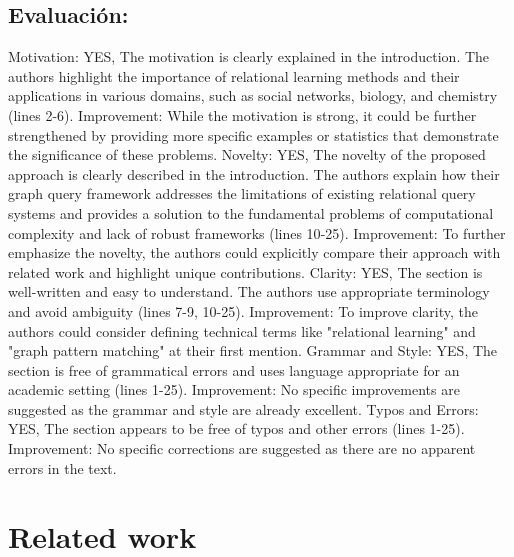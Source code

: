 \documentclass{article}%
\begin{document}
\subsection{Evaluación:}%
\label{subsec:Evaluacin}%
Motivation: YES, The motivation is clearly explained in the introduction. The authors highlight the importance of relational learning methods and their applications in various domains, such as social networks, biology, and chemistry (lines 2{-}6). Improvement: While the motivation is strong, it could be further strengthened by providing more specific examples or statistics that demonstrate the significance of these problems.\newline%
\newline%
Novelty: YES, The novelty of the proposed approach is clearly described in the introduction. The authors explain how their graph query framework addresses the limitations of existing relational query systems and provides a solution to the fundamental problems of computational complexity and lack of robust frameworks (lines 10{-}25). Improvement: To further emphasize the novelty, the authors could explicitly compare their approach with related work and highlight unique contributions.\newline%
\newline%
Clarity: YES, The section is well{-}written and easy to understand. The authors use appropriate terminology and avoid ambiguity (lines 7{-}9, 10{-}25). Improvement: To improve clarity, the authors could consider defining technical terms like "relational learning" and "graph pattern matching" at their first mention.\newline%
\newline%
Grammar and Style: YES, The section is free of grammatical errors and uses language appropriate for an academic setting (lines 1{-}25). Improvement: No specific improvements are suggested as the grammar and style are already excellent.\newline%
\newline%
Typos and Errors: YES, The section appears to be free of typos and other errors (lines 1{-}25). Improvement: No specific corrections are suggested as there are no apparent errors in the text.

%
\clearpage%
\section{Related work}%
\label{sec:Relatedwork}%
\end{document}

